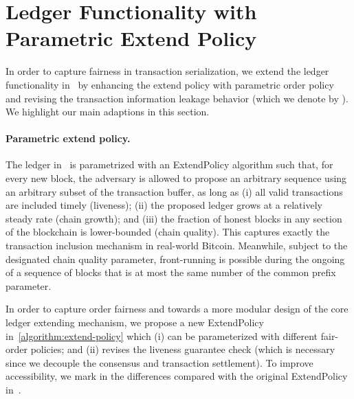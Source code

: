 \section{Ledger Functionality with Parametric Extend Policy}
\label{sec:ledger-functionality-extend-policy}

In order to capture fairness in transaction serialization, we extend the ledger functionality \funcLedger in~\cite{C:BMTZ17} by enhancing the extend policy with parametric order policy and revising the transaction information leakage behavior (which we denote by \funcFairLedger).
%
We highlight our main adaptions in this section.

\paragraph{Parametric extend policy.}
%
The ledger in~\cite{C:BMTZ17} is parametrized with an \textsf{ExtendPolicy} algorithm such that, for every new block, the adversary is allowed to propose an arbitrary sequence using an arbitrary subset of the transaction buffer, as long as
%
(i) all valid transactions are included timely (liveness);
%
(ii) the proposed ledger grows at a relatively steady rate (chain growth);
%
and (iii) the fraction of honest blocks in any section of the blockchain is lower-bounded (chain quality).
%
This captures exactly the transaction inclusion mechanism in real-world Bitcoin.
%
Meanwhile, subject to the designated chain quality parameter, front-running is possible during the ongoing of a sequence of blocks that is at most the same number of the common prefix parameter.

In order to capture order fairness and towards a more modular design of the core ledger extending mechanism, we propose a new \textsf{ExtendPolicy} in~\cref{algorithm:extend-policy} which (i) can be parameterized with different fair-order policies; and (ii) revises the liveness guarantee check (which is necessary since we decouple the consensus and transaction settlement).
%
To improve accessibility, we mark in  the differences compared with the original \textsf{ExtendPolicy} in~\cite{C:BMTZ17}.

